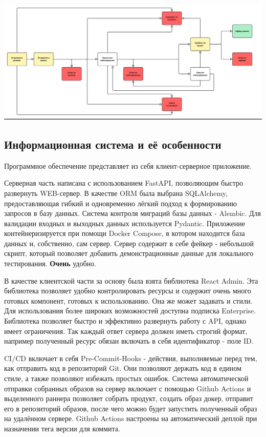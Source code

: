 \documentclass[a4paper,14pt]{extarticle}
\begin{document}
\begin{center}
\includegraphics[width=140mm]{statuses}
\end{center}

\subsection{Информационная система и её особенности}
Программное обеспечение представляет из себя клиент-серверное приложение. 

Серверная часть написана с использованием FastAPI, позволяющим быстро
развернуть WEB-сервер. В качестве ORM была выбрана SQLAlchemy, предоставляющая гибкий и одновременно
лёгкий подход к формированию запросов в базу данных. Система контроля
миграций базы данных - Alembic. Для валидации входных и выходных данных используется
Pydantic. Приложение контейнеризируется при помощи Docker Compose, в котором находится база 
данных и, собственно, сам сервер. Сервер содержит в себе фейкер - небольшой скрипт, который 
позволяет добавить демонстрационные данные для локального тестирования. \textbf{Очень} удобно.

В качестве клиентской части за основу была взята библиотека React Admin. Эта библиотека
позволяет удобно контролировать ресурсы и содержит очень много готовых компонент, готовых
к использованию. Она же может задавать и стили. Для использования более широких возможностей
доступна подписка Enterprise. Библиотека позволяет быстро и эффективно развернуть работу с API, 
однако имеет ограничения. Так каждый ответ сервера должен иметь строгий формат, например
полученный ресурс обязан включать в себя идентификатор - поле ID.

CI/CD включает в себя Pre-Commit-Hooks - действия, выполняемые перед тем, как отправить код
в репозиторий Git. Они позволяют держать код в едином стиле, а также позволяют 
избежать простых ошибок. Система автоматической отправки собранных образов на сервер 
включает с помощью Github Actions и выделенного раннера позволяет собрать продукт, 
создать образ докер, отправит его в репозиторий образов, после чего можно будет 
запустить полученный образ на удалённом сервере. Github Actions настроены на автоматический
деплой при назначении тега версии для коммита.
\end{document}
